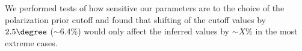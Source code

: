 We performed tests of how sensitive our parameters are to the choice of the
polarization prior cutoff and found that shifting of the cutoff values by
$2.5\degree$ ($\sim 6.4\%$)  would only affect the inferred values by
$\sim X\%$ in the most extreme cases. 

